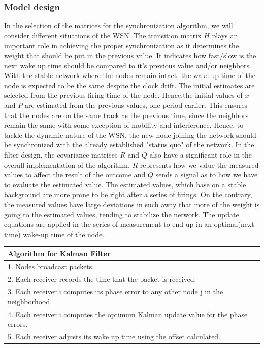 \documentclass[a4paper,10pt]{report}
\begin{document}
\subsubsection{Model design}
In the selection of the matrices for the synchronization algorithm, we will consider different situations of the WSN.
\newline
The transition matrix $H$ plays an important role in achieving the proper synchronization as it determines the weight that should
be put in the previous value. It indicates how fast/slow is the next wake up time should be compared to it's previous value and/or neighbors. With the stable network where the nodes remain intact, the wake-up time of the node is expected to be the same despite the clock drift.
\newline
The initial estimates are selected from the previous firing time of the node. Hence,the initial values of $x$ and $P$ are estimated from the previous values, one period earlier. This ensures that the nodes are on the same track as the previous time, since the neighbors remain the same with some exception of mobility and interference. \newline
Hence, to tackle the dynamic nature of the WSN, the new node joining the network should be synchronized with the already established "status quo" of the network. In the filter design, the covariance matrices $R$ and $Q$ also have a significant role in the overall implementation of the algorithm. $R$ represents how we value the measured values to affect the result of the outcome and $Q$ sends a signal as to how we have to evaluate the estimated value. \newline The estimated values, which base on a stable background are more prone to be right after a series of firings. On the contrary, the measured values have large deviations in such away that more of the weight is going to the estimated values, tending to stabilize the network. \newline The update equations are applied in the series of measurement
to end up in an optimal(next time) wake-up time of the node.
\newline  \newline
\begin{tabular}{  l }Algorithm for Kalman Filter \\ \hline \hline
1. Nodes broadcast packets. \\  2. Each receiver records the time that the packet is received. \\
3. Each receiver i computes its phase error to any other node j in the neighborhood. \\
4. Each receiver i computes the optimum Kalman update value for the phase errors. \\
5. Each receiver adjusts its wake up time using the offset calculated.\\
\hline \hline
\end{tabular}
\end{document}
